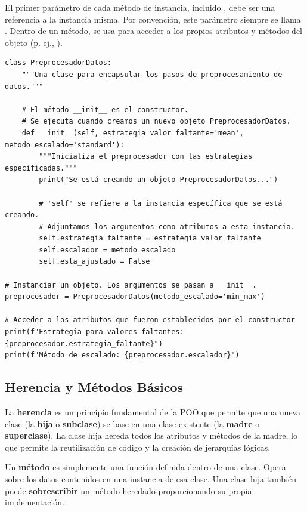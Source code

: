 El primer parámetro de cada método de instancia, incluido , debe ser una referencia a la instancia misma. Por convención, este parámetro siempre se llama \textbf{}. Dentro de un método,  se usa para acceder a los propios atributos y métodos del objeto (p. ej., ).

\begin{example}
\text{ }\begin{verbatim}
class PreprocesadorDatos:
    """Una clase para encapsular los pasos de preprocesamiento de datos."""
    
    # El método __init__ es el constructor.
    # Se ejecuta cuando creamos un nuevo objeto PreprocesadorDatos.
    def __init__(self, estrategia_valor_faltante='mean', metodo_escalado='standard'):
        """Inicializa el preprocesador con las estrategias especificadas."""
        print("Se está creando un objeto PreprocesadorDatos...")
        
        # 'self' se refiere a la instancia específica que se está creando.
        # Adjuntamos los argumentos como atributos a esta instancia.
        self.estrategia_faltante = estrategia_valor_faltante
        self.escalador = metodo_escalado
        self.esta_ajustado = False

# Instanciar un objeto. Los argumentos se pasan a __init__.
preprocesador = PreprocesadorDatos(metodo_escalado='min_max')

# Acceder a los atributos que fueron establecidos por el constructor
print(f"Estrategia para valores faltantes: {preprocesador.estrategia_faltante}")
print(f"Método de escalado: {preprocesador.escalador}")
\end{verbatim}
\end{example}

\subsection{Herencia y Métodos Básicos}
\label{subsec:inheritance}
La \textbf{herencia} es un principio fundamental de la POO que permite que una nueva clase (la \textbf{hija} o \textbf{subclase}) se base en una clase existente (la \textbf{madre} o \textbf{superclase}). La clase hija hereda todos los atributos y métodos de la madre, lo que permite la reutilización de código y la creación de jerarquías lógicas.

Un \textbf{método} es simplemente una función definida dentro de una clase. Opera sobre los datos contenidos en una instancia de esa clase. Una clase hija también puede \textbf{sobrescribir} un método heredado proporcionando su propia implementación.


